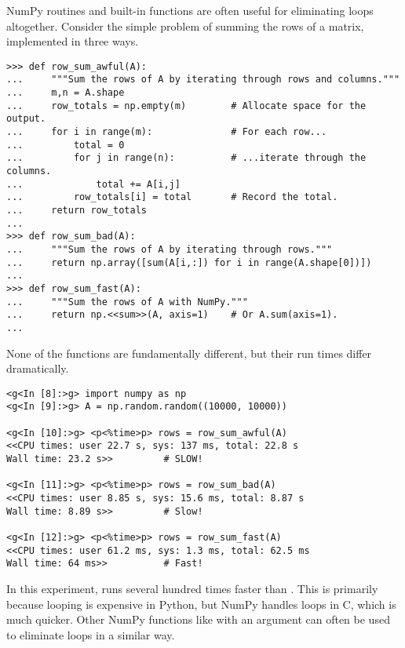 NumPy routines and built-in functions are often useful for eliminating loops altogether. %
Consider the simple problem of summing the rows of a matrix, implemented in three ways.

\begin{lstlisting}
>>> def row_sum_awful(A):
...     """Sum the rows of A by iterating through rows and columns."""
...     m,n = A.shape
...     row_totals = np.empty(m)        # Allocate space for the output.
...     for i in range(m):              # For each row...
...         total = 0
...         for j in range(n):          # ...iterate through the columns.
...             total += A[i,j]
...         row_totals[i] = total       # Record the total.
...     return row_totals
...
>>> def row_sum_bad(A):
...     """Sum the rows of A by iterating through rows."""
...     return np.array([sum(A[i,:]) for i in range(A.shape[0])])
...
>>> def row_sum_fast(A):
...     """Sum the rows of A with NumPy."""
...     return np.<<sum>>(A, axis=1)    # Or A.sum(axis=1).
...
\end{lstlisting}

None of the functions are fundamentally different, but their run times differ dramatically.

\begin{lstlisting}
<g<In [8]:>g> import numpy as np
<g<In [9]:>g> A = np.random.random((10000, 10000))

<g<In [10]:>g> <p<%time>p> rows = row_sum_awful(A)
<<CPU times: user 22.7 s, sys: 137 ms, total: 22.8 s
Wall time: 23.2 s>>         # SLOW!

<g<In [11]:>g> <p<%time>p> rows = row_sum_bad(A)
<<CPU times: user 8.85 s, sys: 15.6 ms, total: 8.87 s
Wall time: 8.89 s>>         # Slow!

<g<In [12]:>g> <p<%time>p> rows = row_sum_fast(A)
<<CPU times: user 61.2 ms, sys: 1.3 ms, total: 62.5 ms
Wall time: 64 ms>>          # Fast!
\end{lstlisting}

In this experiment,  runs several hundred times faster than .
This is primarily because looping is expensive in Python, but NumPy handles loops in C, which is much quicker.
Other NumPy functions like  with an  argument can often be used to eliminate loops in a similar way.

